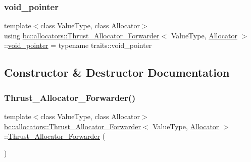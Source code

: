 \subsubsection{\texorpdfstring{void\+\_\+pointer}{void\_pointer}}
{\footnotesize\ttfamily template$<$class Value\+Type, class Allocator$>$ \\
using \hyperlink{structbc_1_1allocators_1_1Thrust__Allocator__Forwarder}{bc\+::allocators\+::\+Thrust\+\_\+\+Allocator\+\_\+\+Forwarder}$<$ Value\+Type, \hyperlink{classbc_1_1allocators_1_1Allocator}{Allocator} $>$\+::\hyperlink{structbc_1_1allocators_1_1Thrust__Allocator__Forwarder_a8278047ac998af0b8799ac01fc78f45d}{void\+\_\+pointer} =  typename traits\+::void\+\_\+pointer}



\subsection{Constructor \& Destructor Documentation}
\mbox{\label{structbc_1_1allocators_1_1Thrust__Allocator__Forwarder_a1029d052cf656bbdd7f3cb48fd37494e}} 
\subsubsection{\texorpdfstring{Thrust\+\_\+\+Allocator\+\_\+\+Forwarder()}{Thrust\_Allocator\_Forwarder()}\hspace{0.1cm}{\footnotesize\ttfamily [1/5]}}
{\footnotesize\ttfamily template$<$class Value\+Type, class Allocator$>$ \\
\hyperlink{structbc_1_1allocators_1_1Thrust__Allocator__Forwarder}{bc\+::allocators\+::\+Thrust\+\_\+\+Allocator\+\_\+\+Forwarder}$<$ Value\+Type, \hyperlink{classbc_1_1allocators_1_1Allocator}{Allocator} $>$\+::\hyperlink{structbc_1_1allocators_1_1Thrust__Allocator__Forwarder}{Thrust\+\_\+\+Allocator\+\_\+\+Forwarder} (\begin{DoxyParamCaption}{ }\end{DoxyParamCaption})\hspace{0.3cm}{\ttfamily [inline]}}

